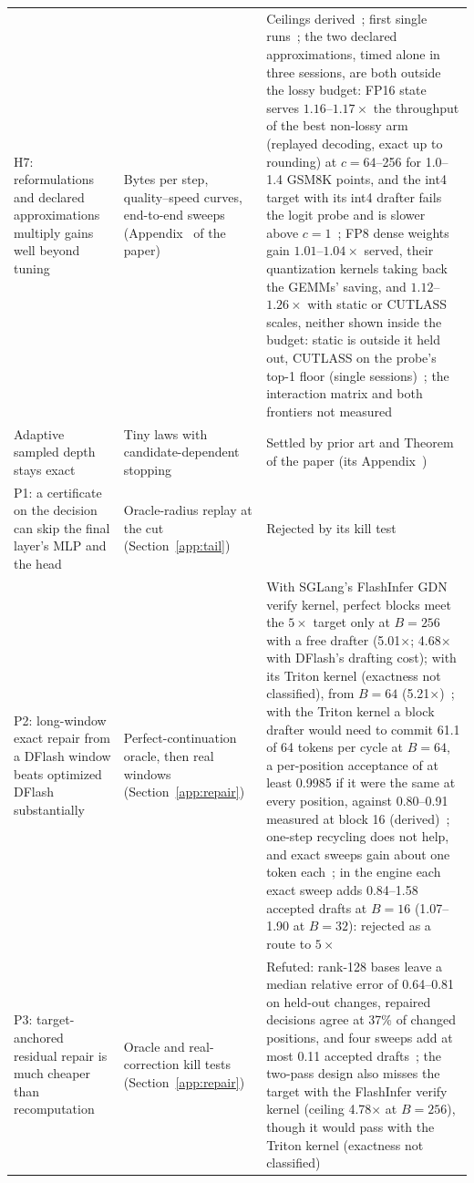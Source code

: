 {\begin{longtable}{@{}P{5.2cm}P{4.6cm}P{6.5cm}@{}}
H7: reformulations and declared approximations multiply gains well beyond tuning & Bytes per step, quality--speed curves, end-to-end sweeps (Appendix~ of the paper) & Ceilings derived~; first single runs~; the two declared approximations, timed alone in three sessions, are both outside the lossy budget: FP16 state serves $1.16$--$1.17\times$ the throughput of the best non-lossy arm (replayed decoding, exact up to rounding) at $c=64$--256 for 1.0--1.4 GSM8K points, and the int4 target with its int4 drafter fails the logit probe and is slower above $c=1$~; FP8 dense weights gain $1.01$--$1.04\times$ served, their quantization kernels taking back the GEMMs' saving, and $1.12$--$1.26\times$ with static or CUTLASS scales, neither shown inside the budget: static is outside it held out, CUTLASS on the probe's top-1 floor (single sessions)~; the interaction matrix and both frontiers not measured\\
\quad Adaptive sampled depth stays exact & Tiny laws with candidate-dependent stopping & Settled by prior art and Theorem~ of the paper (its Appendix~)\\
P1: a certificate on the decision can skip the final layer's MLP and the head & Oracle-radius replay at the cut (Section~\ref{app:tail}) & Rejected by its kill test~\\
P2: long-window exact repair from a DFlash window beats optimized DFlash substantially & Perfect-continuation oracle, then real windows (Section~\ref{app:repair}) & With SGLang's FlashInfer GDN verify kernel, perfect blocks meet the $5\times$ target only at $B=256$ with a free drafter (5.01$\times$; 4.68$\times$ with DFlash's drafting cost); with its Triton kernel (exactness not classified), from $B=64$ (5.21$\times$)~; with the Triton kernel a block drafter would need to commit 61.1 of 64 tokens per cycle at $B=64$, a per-position acceptance of at least 0.9985 if it were the same at every position, against 0.80--0.91 measured at block 16 (derived)~; one-step recycling does not help, and exact sweeps gain about one token each~; in the engine each exact sweep adds 0.84--1.58 accepted drafts at $B=16$ (1.07--1.90 at $B=32$): rejected as a route to $5\times$~\\
P3: target-anchored residual repair is much cheaper than recomputation & Oracle and real-correction kill tests (Section~\ref{app:repair}) & Refuted: rank-128 bases leave a median relative error of 0.64--0.81 on held-out changes, repaired decisions agree at 37\% of changed positions, and four sweeps add at most 0.11 accepted drafts~; the two-pass design also misses the target with the FlashInfer verify kernel (ceiling 4.78$\times$ at $B=256$), though it would pass with the Triton kernel (exactness not classified)~\\

\end{longtable}}
